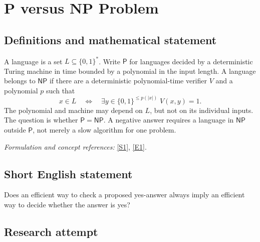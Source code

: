 \documentclass[11pt]{article}
\newcommand{\sref}[2]{\hyperlink{source:#1:#2}{[S#2]}}
\newcommand{\eref}[2]{\hyperlink{extra:#1:#2}{[E#2]}}
\newif\ifshowcatalogue
\newcommand{\cataloguescope}[1]{\ifshowcatalogue
 \paragraph{Exact scope in the supplied catalogue.}
 \begin{quote}\small #1\end{quote}\fi}
\begin{document}
\setcounter{section}{0}
\clearpage
\section*{\texorpdfstring{P versus NP Problem}{P versus NP Problem}}\label{1}
\subsection{Definitions and mathematical statement}
A language is a set $L\subseteq\{0,1\}^*$. Write $\mathsf P$ for languages decided by a deterministic Turing machine in time bounded by a polynomial in the input length. A language belongs to $\mathsf{NP}$ if there are a deterministic polynomial-time verifier $V$ and a polynomial $p$ such that
\[
 x\in L\quad\Longleftrightarrow\quad \exists y\in\{0,1\}^{\le p(|x|)}\;V(x,y)=1.
\]
The polynomial and machine may depend on $L$, but not on its individual inputs. The question is whether $\mathsf P=\mathsf{NP}$. A negative answer requires a language in $\mathsf{NP}$ outside $\mathsf P$, not merely a slow algorithm for one problem.
\par\smallskip\textit{Formulation and concept references:} \sref{1}{1}, \eref{1}{1}.
\cataloguescope{Determine whether P = NP, that is, whether every decision problem whose solutions can be verified in polynomial time by a deterministic Turing machine can also be solved in polynomial time by a deterministic Turing machine.}
\subsection{Short English statement}
Does an efficient way to check a proposed yes-answer always imply an efficient way to decide whether the answer is yes?
\subsection{Research attempt}
\end{document}
